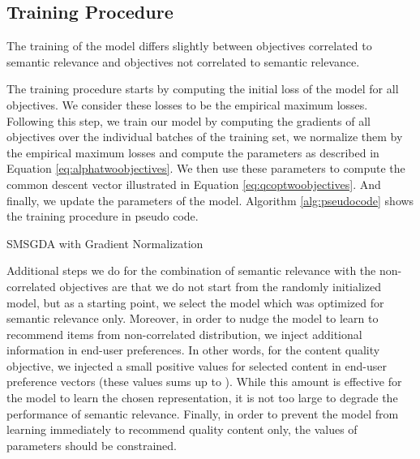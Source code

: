\documentclass[letterpaper]{article}
\begin{document}
\subsection{Training Procedure}

The training of the model differs slightly between objectives correlated to semantic relevance and objectives not correlated to semantic relevance. 

The training procedure starts by computing the initial loss of the model for all objectives. We consider these losses to be the empirical maximum losses. Following this step, we train our model by computing the gradients of all objectives over the individual batches of the training set, we normalize them by the empirical maximum losses and compute the  parameters as described in Equation \ref{eq:alphatwoobjectives}. We then use these  parameters to compute the common descent vector illustrated in Equation \ref{eq:qcoptwoobjectives}. And finally, we update the parameters of the model. Algorithm \ref{alg:pseudocode} shows the training procedure in pseudo code.

\begin{algorithm}
    \scriptsize
    \caption{SMSGDA with Gradient Normalization}
    \label{alg:pseudocode}
    \begin{algorithmic}[1] 
            \State 
            \For{}
                \State 
            \EndFor

            \For{}
                \For{}
                    \State 
                    \State 
                    \State 
                    \For{}
                        \State 
                        \State 
                        \State 
                    \EndFor
                    
                    \State 
                    \State 
                    \State 
                \EndFor
            \EndFor
    \end{algorithmic}
\end{algorithm}

Additional steps we do for the combination of semantic relevance with the non-correlated objectives are that we do not start from the randomly initialized model, but as a starting point, we select the model which was optimized for semantic relevance only. Moreover, in order to nudge the model to learn to recommend items from non-correlated distribution, we inject additional information in end-user preferences. In other words, for the content quality objective, we injected a small positive values for selected content in end-user preference vectors (these values sums up to ). While this amount is effective for the model to learn the chosen representation, it is not too large to degrade the performance of semantic relevance. Finally, in order to prevent the model from learning immediately to recommend quality content only, the values of  parameters should be constrained.
\end{document}
